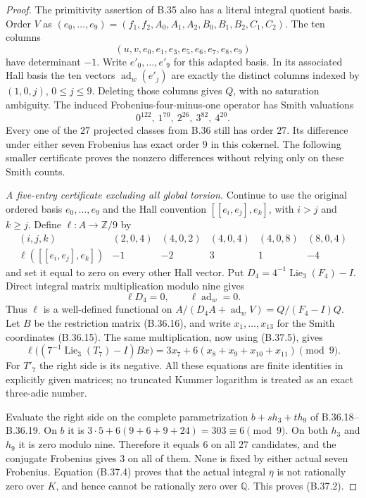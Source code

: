 \begin{proof}
The primitivity assertion of B.35 also has a literal
integral quotient basis. Order $V$ as
$(e_0,\ldots,e_9)=(f_1,f_2,A_0,A_1,A_2,B_0,B_1,B_2,C_1,C_2)$.
The ten columns
\[
             (u,v,e_0,e_1,e_3,e_5,e_6,e_7,e_8,e_9)
                                                               \tag{B.37.6}
\]
have determinant $-1$.
Write $e'_0,\ldots,e'_9$ for this adapted basis.
In its associated Hall basis the ten vectors
$\operatorname{ad}_w(e'_j)$ are exactly the distinct
columns indexed by $(1,0,j)$, $0\le j\le9$.
Deleting those columns gives $Q$, with no saturation
ambiguity. The induced Frobenius-four-minus-one operator
has Smith valuations
\[
                     0^{122},\ 1^{70},\ 2^{26},\ 3^{82},\ 4^{20}.
                                                               \tag{B.37.7}
\]
Every one of the $27$ projected classes from B.36 still
has order $27$. Its difference under either seven
Frobenius has exact order $9$ in this cokernel.
The following smaller certificate proves the nonzero
differences without relying only on these Smith counts.

\emph{A five-entry certificate excluding all global torsion.}
Continue to use the original ordered basis $e_0,\ldots,e_9$
and the Hall convention $[[e_i,e_j],e_k]$, with $i>j$
and $k\ge j$. Define $\ell:A\to\mathbb Z/9$ by
\[
 \begin{array}{c|rrrrr}
 (i,j,k)&(2,0,4)&(4,0,2)&(4,0,4)&(4,0,8)&(8,0,4)\\ \hline
 \ell([[e_i,e_j],e_k])&-1&-2&3&1&-4
 \end{array}                                                  \tag{B.37.8}
\]
and set it equal to zero on every other Hall vector.
Put $D_4=4^{-1}\operatorname{Lie}_3(F_4)-I$.
Direct integral matrix multiplication modulo nine gives
\[
             \ell D_4=0,\qquad \ell\operatorname{ad}_w=0.
                                                               \tag{B.37.9}
\]
Thus $\ell$ is a well-defined functional on
$A/(D_4A+\operatorname{ad}_wV)=Q/(F_4-I)Q$.
Let $B$ be the restriction matrix (B.36.16), and write
$x_1,\ldots,x_{13}$ for the Smith coordinates (B.36.15).
The same multiplication, now using (B.37.5), gives
\[
 \ell\bigl((7^{-1}\operatorname{Lie}_3(T_7)-I)Bx\bigr)
       =3x_7+6(x_8+x_9+x_{10}+x_{11})\pmod9.                 \tag{B.37.10}
\]
For $T'_7$ the right side is its negative.
All these equations are finite identities in explicitly
given matrices; no truncated Kummer logarithm is treated
as an exact three-adic number.

Evaluate the right side on the complete parametrization
$b+s h_3+t h_9$ of B.36.18--B.36.19. On $b$ it is
$3\cdot5+6(9+6+9+24)=303\equiv6\pmod9$.
On both $h_3$ and $h_9$ it is zero modulo nine.
Therefore it equals $6$ on all $27$ candidates, and
the conjugate Frobenius gives $3$ on all of them.
None is fixed by either actual seven Frobenius.
Equation (B.37.4) proves that the actual integral
$\overline\eta$ is not rationally zero over $K$,
and hence cannot be rationally zero over $\mathbb Q$.
This proves (B.37.2).


\end{proof}
